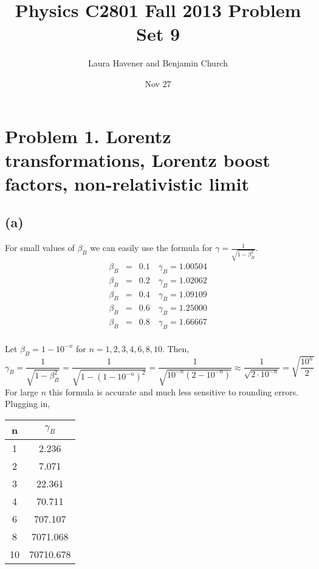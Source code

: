 \documentclass[11pt]{amsart}
\title{Physics C2801 Fall 2013 Problem Set 9}
\author{Laura Havener and Benjamin Church}
\date{Nov 27} %
\begin{document}
\maketitle

\section*{Problem 1. Lorentz transformations, Lorentz boost factors, non-relativistic limit}
\subsection*{(a)}
For small values of $\beta_{B}$ we can easily use the formula for $\gamma = \frac{1}{\sqrt{1 - \beta_{B}^2}}$.  
\begin{eqnarray*}
\beta_{B} &=& 0.1 \quad
\gamma_{B} = 1.00504 \\
\beta_{B} &=& 0.2 \quad
\gamma_{B} = 1.02062 \\
\beta_{B} &=& 0.4 \quad
\gamma_{B} = 1.09109 \\
\beta_{B} &=& 0.6 \quad
\gamma_{B} = 1.25000 \\
\beta_{B} &=& 0.8 \quad
\gamma_{B} = 1.66667 
\end{eqnarray*} \\
Let $\beta_{B} = 1 - 10^{-n}$ for $n = 1,2,3,4,6,8,10$. Then,
\[\gamma_B = \frac{1}{\sqrt{1 - \beta_{B}^2}} = \frac{1}{\sqrt{1 - (1  - 10^{-n})^2}} = \frac{1}{\sqrt{10^{-n} (2 - 10^{-n})}} \approx \frac{1}{\sqrt{2 \cdot 10^{-n}}} = \sqrt{\frac{10^{n}}{2}} \]
For large $n$ this formula is accurate and much less sensitive to rounding errors. 
Plugging in,
\begin{center}
\begin{tabular}{c | c}
n & $\gamma_B$ \\
\hline
1 & 2.236 \\
2 & 7.071 \\
3 & 22.361 \\
4 & 70.711 \\
6 & 707.107 \\
8 & 7071.068 \\
10 & 70710.678
\end{tabular}
\end{center}
\end{document}
